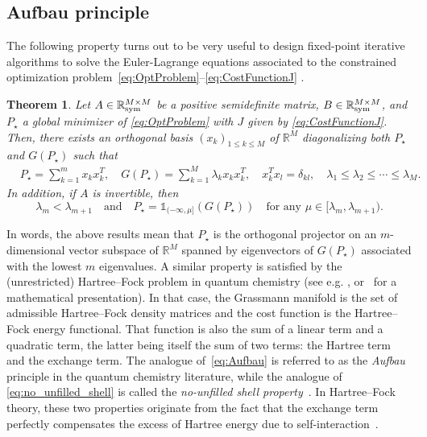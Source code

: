 \documentclass{article}
\def\R{\mathbb R}
\newtheorem{theorem}{Theorem}
\newcommand{\1}{{\mathds 1}}
\begin{document}
\subsection{Aufbau principle}
\label{sec:Aufbau}

The following property turns out to be very useful to design fixed-point iterative algorithms to solve the Euler-Lagrange equations associated to the constrained optimization problem~\eqref{eq:OptProblem}--\eqref{eq:CostFunctionJ} .

\begin{theorem} \label{thm:Aufbau}
    Let $A \in \R^{M \times M}_{\rm sym}$ be a positive semidefinite matrix, $B \in \R^{M \times M}_{\rm sym}$, and $P_\star$ a global minimizer of \eqref{eq:OptProblem} with $J$ given by \eqref{eq:CostFunctionJ}. Then, there exists an orthogonal basis $(x_k)_{1 \le k \le M}$ of $\R^M$ diagonalizing both $P_\star$ and $G(P_\star)$ such that
   \begin{align}
   & P_\star = \sum_{k=1}^m x_kx_k^T, \quad G(P_\star) = \sum_{k=1}^M \lambda_k x_kx_k^T,   \quad x_k^Tx_l=\delta_{kl}, \quad \lambda_1 \le \lambda_2 \le \cdots \le \lambda_M.  \label{eq:Aufbau}
\end{align}
In addition, if $A$ is invertible, then 
\begin{equation} \label{eq:no_unfilled_shell}
\lambda_m < \lambda_{m+1} \quad \mbox{and} \quad    P_\star=\mathds 1_{(-\infty,\mu]}(G(P_\star)) \quad \mbox{for any } \mu \in [\lambda_m ,\lambda_{m+1}).
\end{equation}
\end{theorem}


In words, the above results mean that $P_\star$ is the orthogonal projector on an $m$-dimensional vector subspace of $\R^M$ spanned by eigenvectors of $G(P_\star)$ associated with the lowest $m$ eigenvalues. A similar property is satisfied by the (unrestricted) Hartree--Fock problem in quantum chemistry (see e.g. \cite{szabo2012modern}, or~\cite{Bach:2022ewx} for a mathematical presentation). In that case, the Grassmann manifold is the set of admissible Hartree--Fock density matrices and the cost function is the Hartree--Fock energy functional. That function is also the sum of a linear term and a quadratic term, the latter being itself the sum of two terms: the Hartree term and the exchange term. The analogue of~\eqref{eq:Aufbau} is referred to as the {\em Aufbau} principle in the quantum chemistry literature, while the analogue of \eqref{eq:no_unfilled_shell} is called the {\em no-unfilled shell property}~\cite{DMET2012}. In Hartree--Fock theory, these two properties originate from the fact that the exchange term perfectly compensates the excess of Hartree energy due to self-interaction~\cite{szabo2012modern}.
\end{document}
